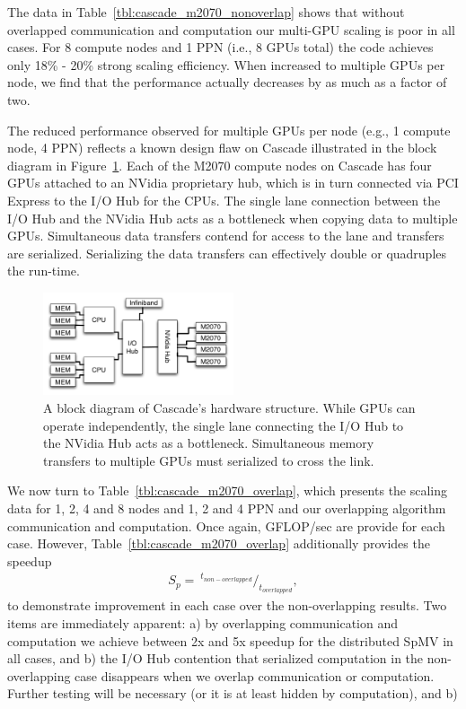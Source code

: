 The data in Table~\ref{tbl:cascade_m2070_nonoverlap} shows that without overlapped communication and computation our multi-GPU scaling is poor in all cases. For 8 compute nodes and 1 PPN (i.e., 8 GPUs total) the code achieves only 18\% - 20\% strong scaling efficiency. When increased to multiple GPUs per node, we find that the performance actually decreases by as much as a factor of two. 

The reduced performance observed for multiple GPUs per node (e.g., 1 compute node, 4 PPN) reflects a known design flaw on Cascade illustrated in the block diagram in Figure~\ref{fig:cascade_iohub}. Each of the M2070 compute nodes on Cascade has four GPUs attached to an NVidia proprietary hub, which is in turn connected via PCI Express to the I/O Hub for the CPUs. The single lane connection between the I/O Hub and the NVidia Hub acts as a bottleneck when copying data to multiple GPUs. Simultaneous data transfers contend for access to the lane and transfers are serialized. Serializing the data transfers can effectively double or quadruples the run-time. 

\begin{figure}
\centering
\includegraphics[width=0.5\textwidth]{gpu_content/omnigraffle/CascadeIOHub.pdf}
\caption{A block diagram of Cascade's hardware structure. While GPUs can operate independently, the single lane connecting the I/O Hub to the NVidia Hub acts as a bottleneck. Simultaneous memory transfers to multiple GPUs must serialized to cross the link. }
\label{fig:cascade_iohub}
\end{figure}

We now turn to Table~\ref{tbl:cascade_m2070_overlap}, which presents the scaling data for 1, 2, 4 and 8 nodes and 1, 2 and 4 PPN and our overlapping  algorithm communication and computation. Once again, GFLOP/sec are provide for each case. However, Table~\ref{tbl:cascade_m2070_overlap} additionally provides the speedup
\begin{align*} 
S_p = \ ^{t_{non-overlapped}} /_{t_{overlapped}},
\end{align*}
to demonstrate improvement in each case over the non-overlapping results. Two items are immediately apparent: a) by overlapping communication and computation we achieve between 2x and 5x speedup for the distributed SpMV in all cases, and b) the I/O Hub contention that serialized computation in the non-overlapping case disappears when we overlap communication or computation. Further testing will be necessary  (or it is at least hidden by computation), and b) 



